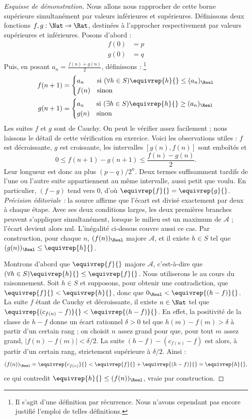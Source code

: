 \documentclass[11pt,a4paper,openany]{memoir}
\begin{document}
\begin{proof}[Esquisse de démonstration]
Nous allons nous rapprocher de cette borne supérieure simultanément
par valeurs inférieures et supérieures. Définissons deux fonctions
$f,g:\Nat\to\Rat$, destinées à l'approcher respectivement par valeurs
supérieures et inférieures. Posons d'abord :
\begin{align*}
f(0)&=p\\
g(0)&=q
\end{align*}
Puis, en posant $a_n=\frac{f(n)+g(n)}2$, définissons :
\footnote{Il s'agit d'une définition par récurrence. Nous n'avons
cependant pas encore justifié l'emploi de telles définitions.}
\begin{align*}
f(n+1)&=\begin{cases}
a_n &\text{si }(\forall h\in S)\equivrep{h}{}\leq(a_n)_\Real\\
f(n)&\text{sinon}
\end{cases}\\
g(n+1)&=\begin{cases}
a_n &\text{si }(\exists h\in S)\equivrep{h}{}\geq(a_n)_\Real\\
g(n)&\text{sinon}
\end{cases}
\end{align*}
Les suites $f$ et $g$ sont de Cauchy. On peut le vérifier assez
facilement ; nous laissons le détail de cette vérification en exercice.
Voici les observations utiles : $f$ est décroissante, $g$ est
croissante, les intervalles $[g(n),f(n)]$ sont emboîtés et
\[
0\leq f(n+1)-g(n+1)\leq\frac{f(n)-g(n)}2.
\]
Leur longueur est donc au plus $(p-q)/2^n$. Deux termes suffisamment
tardifs de l'une ou l'autre suite appartiennent au même intervalle,
aussi petit que voulu. En particulier, $(f-g)$ tend vers $0$,
d'où $\equivrep{f}{}=\equivrep{g}{}$.
\emph{Précision éditoriale :} la source affirme que l'écart est divisé
exactement par deux à chaque étape. Avec ses deux conditions larges,
les deux premières branches peuvent s'appliquer simultanément, lorsque
le milieu est un maximum de $\mathcal A$ ; l'écart devient alors nul.
L'inégalité ci-dessus couvre aussi ce cas. Par construction, pour
chaque $n$, $(f(n))_\Real$ majore $\mathcal A$, et il existe
$h\in S$ tel que $(g(n))_\Real\leq\equivrep{h}{}$.

Montrons d'abord que $\equivrep{f}{}$ majore $\mathcal A$,
c'est-à-dire que
$(\forall h\in S)\equivrep{h}{}\leq\equivrep{f}{}$.
Nous utiliserons le  au cours du raisonnement.
Soit $h\in S$ et supposons, pour obtenir une contradiction, que
$\equivrep{f}{}<\equivrep{h}{}$, donc que
$0_\Real<\equivrep{(h-f)}{}$. La suite $f$ étant de Cauchy et
décroissante, il existe $n\in\Nat$ tel que
$\equivrep{(c_{f(n)}-f)}{}<\equivrep{(h-f)}{}$.
En effet, la positivité de la classe de $h-f$ donne un écart rationnel
$\delta>0$ tel que $h(m)-f(m)>\delta$ à partir d'un certain rang ;
on choisit $n$ assez grand pour que, pour tout $m$ assez grand,
$|f(n)-f(m)|<\delta/2$. La suite
$(h-f)-(c_{f(n)}-f)$ est alors, à partir d'un certain rang,
strictement supérieure à $\delta/2$.
Ainsi :
\[
(f(n))_\Real=\equivrep{c_{f(n)}}{}
<\equivrep{f}{}+\equivrep{(h-f)}{}=\equivrep{h}{},
\]
ce qui contredit $\equivrep{h}{}\leq(f(n))_\Real$, vraie par construction.


\end{proof}
\end{document}
